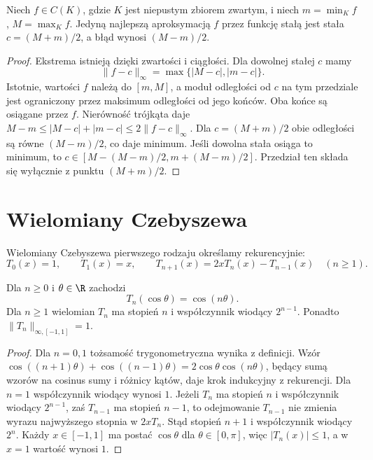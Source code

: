 \begin{stwierdzenie}
\label{ma2:prop:approx-best-constant}
Niech $f\in C(K)$, gdzie $K$ jest niepustym
zbiorem zwartym, i niech
$m=\min_K f$, $M=\max_K f$.
Jedyną najlepszą aproksymacją $f$ przez funkcję
stałą jest stała $c=(M+m)/2$, a błąd wynosi
$(M-m)/2$.
\end{stwierdzenie}
\begin{proof}
Ekstrema istnieją dzięki zwartości i ciągłości.
Dla dowolnej stałej $c$ mamy
\[
 \|f-c\|_\infty=\max\{|M-c|,|m-c|\}.
\]
Istotnie, wartości $f$ należą do $[m,M]$,
a moduł odległości od $c$ na tym przedziale
jest ograniczony przez maksimum odległości
od jego końców. Oba końce są osiągane przez $f$.
Nierówność trójkąta daje
$M-m\le |M-c|+|m-c|\le2\|f-c\|_\infty$.
Dla $c=(M+m)/2$ obie odległości są równe
$(M-m)/2$, co daje minimum.
Jeśli dowolna stała osiąga to minimum, to
$c\in[M-(M-m)/2,m+(M-m)/2]$.
Przedział ten składa się wyłącznie
z punktu $(M+m)/2$.
\end{proof}

\section{Wielomiany Czebyszewa}

\begin{definicja}
\label{ma2:def:approx-chebyshev}
Wielomiany Czebyszewa pierwszego rodzaju
określamy rekurencyjnie:
\[
 T_0(x)=1,\qquad T_1(x)=x,\qquad
 T_{n+1}(x)=2xT_n(x)-T_{n-1}(x)\quad(n\ge1).
\]
\end{definicja}

\begin{stwierdzenie}
\label{ma2:prop:approx-chebyshev-properties}
Dla $n\ge0$ i $\theta\in\R$ zachodzi
\[
 T_n(\cos\theta)=\cos(n\theta).
\]
Dla $n\ge1$ wielomian $T_n$ ma stopień $n$
i współczynnik wiodący $2^{n-1}$.
Ponadto $\|T_n\|_{\infty,[-1,1]}=1$.
\end{stwierdzenie}
\begin{proof}
Dla $n=0,1$ tożsamość trygonometryczna
wynika z definicji. Wzór
$\cos((n+1)\theta)+\cos((n-1)\theta)
=2\cos\theta\cos(n\theta)$, będący sumą
wzorów na cosinus sumy i różnicy kątów,
daje krok indukcyjny z rekurencji.
Dla $n=1$ współczynnik wiodący wynosi $1$.
Jeżeli $T_n$ ma stopień $n$ i współczynnik
wiodący $2^{n-1}$, zaś $T_{n-1}$ ma
stopień $n-1$, to odejmowanie $T_{n-1}$
nie zmienia wyrazu najwyższego stopnia
w $2xT_n$. Stąd stopień $n+1$ i współczynnik
wiodący $2^n$.
Każdy $x\in[-1,1]$ ma postać $\cos\theta$
dla $\theta\in[0,\pi]$, więc $|T_n(x)|\le1$,
a w $x=1$ wartość wynosi $1$.
\end{proof}

